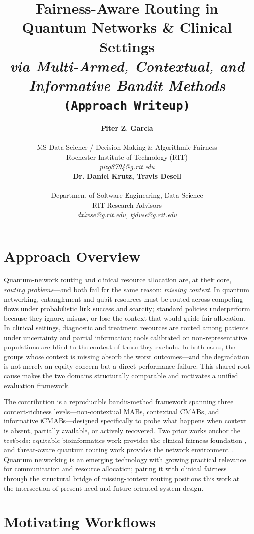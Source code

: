 \documentclass{IEEEtran}
\title{{\LARGE\textbf{Fairness-Aware Routing in Quantum Networks \& Clinical Settings}}\\
{\Large\textit{via Multi-Armed, Contextual, and Informative Bandit Methods}}\\
{\large\texttt{(Approach Writeup)}}}
\author{%
\begin{minipage}{0.48\textwidth}
\begin{center}
{\bf Piter Z. Garcia}\\
\begin{small}
MS Data Science / Decision-Making \& Algorithmic Fairness\\
Rochester Institute of Technology (RIT)\\
{\it pizg8794@g.rit.edu}
\end{small}
\end{center}
\end{minipage}
\hfill
\begin{minipage}{0.48\textwidth}
\begin{center}
{\bf Dr. Daniel Krutz, Travis Desell}\\
\begin{small}
Department of Software Engineering, Data Science\\
RIT Research Advisors\\
{\it dxkvse@g.rit.edu, tjdvse@g.rit.edu}
\end{small}
\end{center}
\end{minipage}%
}
\begin{document}
\maketitle

\section{Approach Overview}

Quantum-network routing and clinical resource allocation are, at their
core, \textit{routing problems}---and both fail for the same reason:
\textit{missing context}. In quantum networking, entanglement and qubit
resources must be routed across competing flows under probabilistic link
success and scarcity; standard policies underperform because they ignore,
misuse, or lose the context that would guide fair allocation. In clinical
settings, diagnostic and treatment resources are routed among patients under
uncertainty and partial information; tools calibrated on non-representative
populations are blind to the context of those they exclude. In both cases,
the groups whose context is missing absorb the worst outcomes---and the
degradation is not merely an equity concern but a direct performance failure.
This shared root cause makes the two domains structurally comparable and
motivates a unified evaluation framework.

The contribution is a reproducible bandit-method framework spanning three
context-richness levels---non-contextual MABs, contextual CMABs, and
informative iCMABs---designed specifically to probe what happens when context
is absent, partially available, or actively recovered. Two prior works anchor
the testbeds: equitable bioinformatics work provides the clinical fairness
foundation \cite{garcia2025equitable_bioinformatics}, and threat-aware
quantum routing work provides the network environment
\cite{garcia2026threat_aware_quantum_routing}. Quantum networking is an
emerging technology with growing practical relevance for communication and
resource allocation; pairing it with clinical fairness through the structural
bridge of missing-context routing positions this work at the intersection of
present need and future-oriented system design.

\section{Motivating Workflows}
\end{document}
